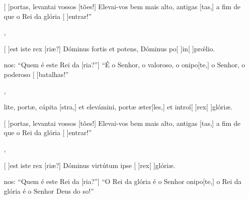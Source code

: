 {    {\item {}[ ]{por}tas, levantai vossos [tões!] Elevai-vos bem mais alto, antigas [tas,] a fim de que o Rei da glória [ ]{en}trar!''~\Antiphona},
  {\item {}[ ]{est} iste rex [riæ?] Dóminus fortis et potens, Dóminus po[ ]{in}[ ]{prœ́}lio.~\Antiphona}%
    {\item {}nos: ``Quem é este Rei da [ria?''] ``É o Senhor, o valoroso, o onipo[te,] o Senhor, o poderoso [ ]{ba}{ta}lhas!''~\Antiphona},
  {\item {}lite, portæ, cápita [stra,] et elevámini, portæ æter[les,] et introí[ ]{rex}[ ]{gló}riæ.~\Antiphona}%
    {\item {}[ ]{por}tas, levantai vossos [tões!] Elevai-vos bem mais alto, antigas [tas,] a fim de que o Rei da glória [ ]{en}trar!''~\Antiphona},
  {\item {}[ ]{est} iste rex [riæ?] Dóminus virtútum ipse [ ]{rex}[ ]{gló}riæ.~\Antiphona}%
    {\item {}nos: ``Quem é este Rei da [ria?''] ``O Rei da glória é o Senhor onipo[te,] o Rei da glória é o Senhor Deus do so!''~\Antiphona}
}